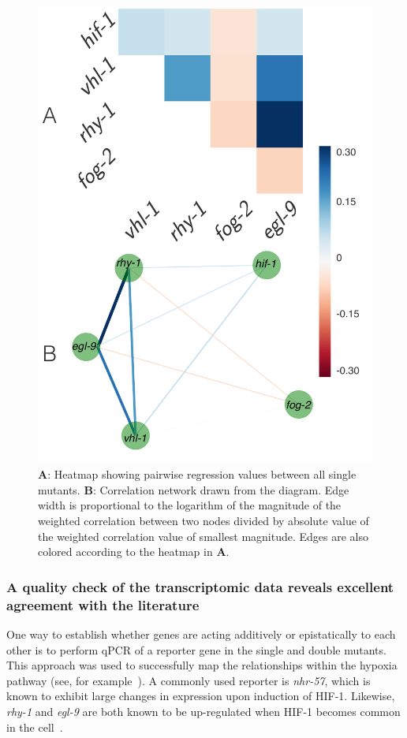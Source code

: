 \documentclass[9pt,twocolumn,twoside]{pnas-new}
\newcommand{\egl}{\emph{egl-9}}
\newcommand{\rhy}{\emph{rhy-1}}
\newcommand{\nhr}{\emph{nhr-57}}
\newcommand{\hifp}{HIF-1}
\begin{document}
\begin{figure}[tbhp]
\centering
\includegraphics[width=\linewidth]{figs/bayesian_heat_map.pdf}
\caption{
\textbf{A}: Heatmap showing pairwise regression values between all
single mutants. \textbf{B}: Correlation network drawn from the diagram. Edge
width is proportional to the logarithm of the magnitude of the weighted
correlation between two nodes divided by absolute value of the weighted
correlation value of smallest magnitude. Edges are also colored according to the
heatmap in \textbf{A}.
}
\label{fig:heatmap}
\end{figure}

\subsubsection*{A quality check of the transcriptomic data reveals excellent agreement
            with the literature}
\label{sub:quality_check}
One way to establish whether genes are acting additively or epistatically to each
other is to perform qPCR of a reporter gene in the single and double mutants. This
approach was used to successfully map the relationships within the hypoxia
pathway (see, for example~\cite{Shao2009,Shen2006}). A commonly used reporter is
\nhr{}, which is known to exhibit large changes in expression upon induction of
\hifp{}\cite{Shen2006,Shen2005,Ackerman2012,
Park2012}. Likewise, \rhy{} and \egl{} are both known to be up-regulated
when \hifp{} becomes common in the cell~\cite{Powell-Coffman2010}.
\end{document}
